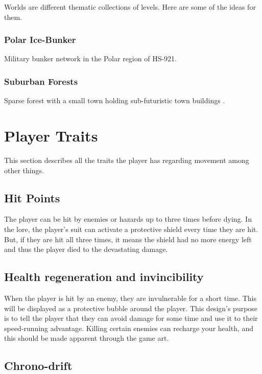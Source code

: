 \documentclass[12pt]{article}
\begin{document}
Worlds are different thematic collections of levels. Here are some of the ideas for them.

\subsubsection{Polar Ice-Bunker}

Military bunker network in the Polar region of HS-921. 

\subsubsection{Suburban Forests}

Sparse forest with a small town holding sub-futuristic town buildings .

\section{Player Traits}

This section describes all the traits the player has regarding movement among other things.

\subsection{Hit Points}

The player can be hit by enemies or hazards up to three times before dying. In the lore, the player's suit can activate a protective shield every time they are hit. But, if they are hit all three times, it means the shield had no more energy left and thus the player died to the devastating damage. 


\subsection{Health regeneration and invincibility}

When the player is hit by an enemy, they are invulnerable for a short time. This will be displayed as a protective bubble around the player. This design's purpose is to tell the player that they can avoid damage for some time and use it to their speed-running advantage. Killing certain enemies can recharge your health, and this should be made apparent through the game art. 

\subsection{Chrono-drift}
\end{document}
